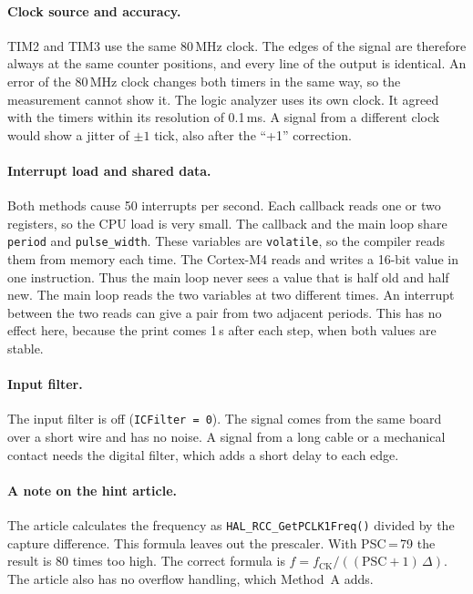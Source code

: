 \documentclass[11pt,a4paper]{article}
\begin{document}
\paragraph{Clock source and accuracy.}
TIM2 and TIM3 use the same 80\,MHz clock. The edges of the signal are
therefore always at the same counter positions, and every line of the output
is identical. An error of the 80\,MHz clock changes both timers in the same
way, so the measurement cannot show it. The logic analyzer uses its own clock.
It agreed with the timers within its resolution of 0.1\,ms. A signal from a
different clock would show a jitter of $\pm 1$ tick, also after the ``+1''
correction.

\paragraph{Interrupt load and shared data.}
Both methods cause 50 interrupts per second. Each callback reads one or two
registers, so the CPU load is very small. The callback and the main loop share
\texttt{period} and \texttt{pulse\_width}. These variables are
\texttt{volatile}, so the compiler reads them from memory each time. The
Cortex-M4 reads and writes a 16-bit value in one instruction. Thus the main
loop never sees a value that is half old and half new. The main loop reads the
two variables at two different times. An interrupt between the two reads can
give a pair from two adjacent periods. This has no effect here, because the
print comes 1\,s after each step, when both values are stable.

\paragraph{Input filter.}
The input filter is off (\texttt{ICFilter = 0}). The signal comes from the same
board over a short wire and has no noise. A signal from a long cable or a
mechanical contact needs the digital filter, which adds a short delay to each
edge.

\paragraph{A note on the hint article.}
The article calculates the frequency as \texttt{HAL\_RCC\_GetPCLK1Freq()}
divided by the capture difference. This formula leaves out the prescaler. With
PSC\,=\,79 the result is 80 times too high. The correct formula is
$f = f_\text{CK} / ((\text{PSC}+1)\,\Delta)$. The article also has no overflow
handling, which Method~A adds.
\end{document}

